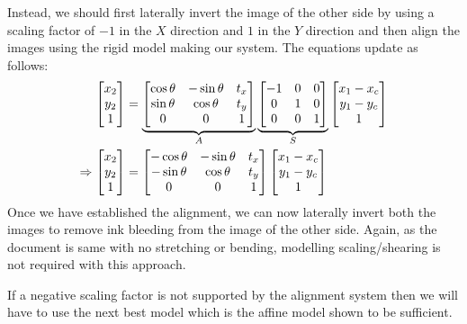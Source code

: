 \documentclass[a4paper]{article}
\begin{document}
\begin{enumerate}[label=(\alph*)]
	Instead, we should first laterally invert the image of the other side by using a scaling factor of $-1$ in the $X$ direction and $1$ in the $Y$ direction and then align the images using the rigid model making our system. The equations update as follows:
	\begin{align}{\label{eq:rigidunequalscaling}}
		\begin{bmatrix}
			x_2\\y_2\\1
		\end{bmatrix}
		&=
		\underbrace{
		\begin{bmatrix}
			\cos\theta & -\sin\theta & t_x\\
			\sin\theta & \cos\theta  & t_y\\
			0          & 0           & 1\\
		\end{bmatrix}
		}_{A}
		\underbrace{
		\begin{bmatrix}
			-1 & 0 & 0\\
			 0 & 1 & 0\\
			 0 & 0 & 1\\
		\end{bmatrix}
		}_{S}
		\begin{bmatrix}
			x_1-x_c\\y_1 - y_c\\1
		\end{bmatrix}
		\\
		\Rightarrow
		\begin{bmatrix}
			x_2\\y_2\\1
		\end{bmatrix}
		&=
		\begin{bmatrix}
			-\cos\theta & -\sin\theta & t_x\\
			-\sin\theta & \cos\theta  & t_y\\
			0           & 0           & 1\\
		\end{bmatrix}
		\begin{bmatrix}
			x_1-x_c\\y_1 - y_c\\1
		\end{bmatrix}
	\end{align}
	Once we have established the alignment, we can now laterally invert both the images to remove ink bleeding from the image of the other side. Again, as the document is same with no stretching or bending, modelling scaling/shearing is not required with this approach.

	If a negative scaling factor is not supported by the alignment system then we will have to use the next best model which is the affine model shown to be sufficient.
\end{enumerate}
\end{document}
